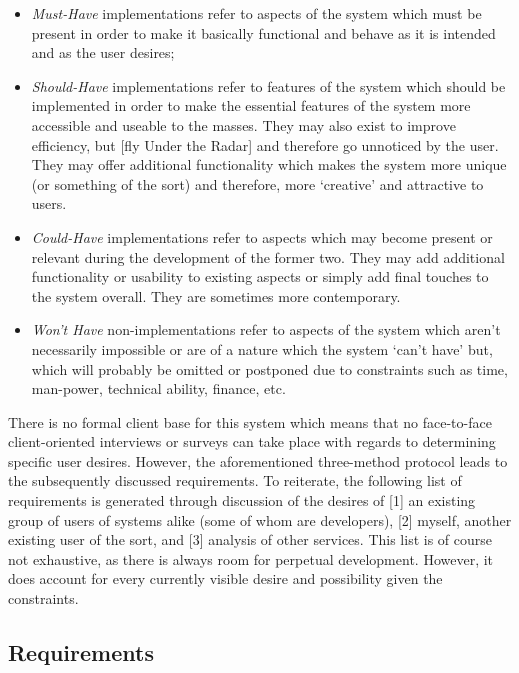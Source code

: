 \documentclass[11pt, english]{article}
\begin{document}
	\begin{itemize}
	\setlength\itemsep{0cm}
		\item \textit{Must-Have} implementations refer to aspects of the system which must be present in order to make it basically functional and behave as it is intended and as the user desires;
		\item \textit{Should-Have} implementations refer to features of the system which should be implemented in order to make the essential features of the system more accessible and useable to the masses. They may also exist to improve efficiency, but [fly Under the Radar] and therefore go unnoticed by the user. They may offer additional functionality which makes the system more unique (or something of the sort) and therefore, more `creative' and attractive to users.
		\item \textit{Could-Have} implementations refer to aspects which may become present or relevant during the development of the former two. They may add additional functionality or usability to existing aspects or simply add final touches to the system overall. They are sometimes more contemporary.
		\item \textit{Won't Have} non-implementations refer to aspects of the system which aren't necessarily impossible or are of a nature which the system `can't have' but, which will probably be omitted or postponed due to constraints such as time, man-power, technical ability, finance, etc.
	\end{itemize}

	There is no formal client base for this system which means that no face-to-face client-oriented interviews or surveys can take place with regards to determining specific user desires. However, the aforementioned three-method protocol leads to the subsequently discussed requirements. To reiterate, the following list of requirements is generated through discussion of the desires of [1] an existing group of users of systems alike (some of whom are developers), [2] myself, another existing user of the sort, and [3] analysis of other services. This list is of course not exhaustive, as there is always room for perpetual development. However, it does account for every currently visible desire and possibility given the constraints.

	\subsection{Requirements}
\end{document}
